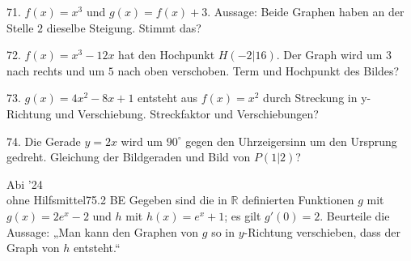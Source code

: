 \documentclass[11pt]{article}
\begin{document}
\begin{pfaufg}{}{71.}{}
$f(x) = x^3$ und $g(x) = f(x) + 3$. Aussage: Beide Graphen haben an der Stelle $2$ dieselbe Steigung. Stimmt das?
\end{pfaufg}
\pfgruppe{}
\begin{pfaufg}{}{72.}{}
$f(x) = x^3 - 12x$ hat den Hochpunkt $H(-2 | 16)$. Der Graph wird um $3$ nach rechts und um $5$ nach oben verschoben. Term und Hochpunkt des Bildes?
\end{pfaufg}
\begin{pfaufg}{}{73.}{}
$g(x) = 4x^2 - 8x + 1$ entsteht aus $f(x) = x^2$ durch Streckung in y-Richtung und Verschiebung. Streckfaktor und Verschiebungen?
\end{pfaufg}
\begin{pfaufg}{}{74.}{}
Die Gerade $y = 2x$ wird um $90 ^\circ $ gegen den Uhrzeigersinn um den Ursprung gedreht. Gleichung der Bildgeraden und Bild von $P(1 | 2)$?
\end{pfaufg}
\pfgruppe{}
\begin{pfaufg}{Abi ’24\\ohne Hilfsmittel}{75.}{2 BE}
Gegeben sind die in $\mathbb{R}$ definierten Funktionen $g$ mit $g(x) = 2e^x - 2$ und $h$ mit $h(x) = e^x + 1$; es gilt $g'(0) = 2$. Beurteile die Aussage: „Man kann den Graphen von $g$ so in $y$-Richtung verschieben, dass der Graph von $h$ entsteht.“
\par\smallskip\noindent {}\par
{}
\end{pfaufg}
\end{document}
